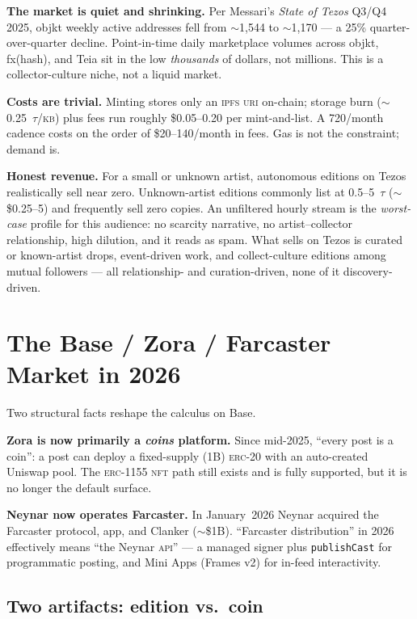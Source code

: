 \documentclass[10pt,letterpaper,twocolumn]{article}
\newcommand{\tzsym}{\text{\textipa{ê}}}
\renewcommand{\tzsym}{\ensuremath{\tau}}
\begin{document}
\textbf{The market is quiet and shrinking.} Per Messari's \emph{State of Tezos} Q3/Q4 2025, objkt weekly active addresses fell from $\sim$1{,}544 to $\sim$1{,}170 --- a 25\% quarter-over-quarter decline. Point-in-time daily marketplace volumes across objkt, fx(hash), and Teia sit in the low \emph{thousands} of dollars, not millions. This is a collector-culture niche, not a liquid market.

\textbf{Costs are trivial.} Minting stores only an \textsc{ipfs} \textsc{uri} on-chain; storage burn ($\sim$0.25~\tzsym/\textsc{kb}) plus fees run roughly \$0.05--0.20 per mint-and-list. A 720/month cadence costs on the order of \$20--140/month in fees. Gas is not the constraint; demand is.

\textbf{Honest revenue.} For a small or unknown artist, autonomous editions on Tezos realistically sell near zero. Unknown-artist editions commonly list at 0.5--5~\tzsym{} ($\sim$\$0.25--5) and frequently sell zero copies. An unfiltered hourly stream is the \emph{worst-case} profile for this audience: no scarcity narrative, no artist--collector relationship, high dilution, and it reads as spam. What sells on Tezos is curated or known-artist drops, event-driven work, and collect-culture editions among mutual followers --- all relationship- and curation-driven, none of it discovery-driven.

\section{The Base / Zora / Farcaster Market in 2026}

Two structural facts reshape the calculus on Base.

\textbf{Zora is now primarily a \emph{coins} platform.} Since mid-2025, ``every post is a coin'': a post can deploy a fixed-supply (1B) \textsc{erc}-20 with an auto-created Uniswap pool. The \textsc{erc}-1155 \textsc{nft} path still exists and is fully supported, but it is no longer the default surface.

\textbf{Neynar now operates Farcaster.} In January~2026 Neynar acquired the Farcaster protocol, app, and Clanker ($\sim$\$1B). ``Farcaster distribution'' in 2026 effectively means ``the Neynar \textsc{api}'' --- a managed signer plus \texttt{publishCast} for programmatic posting, and Mini Apps (Frames v2) for in-feed interactivity.

\subsection{Two artifacts: edition vs.\ coin}
\end{document}
